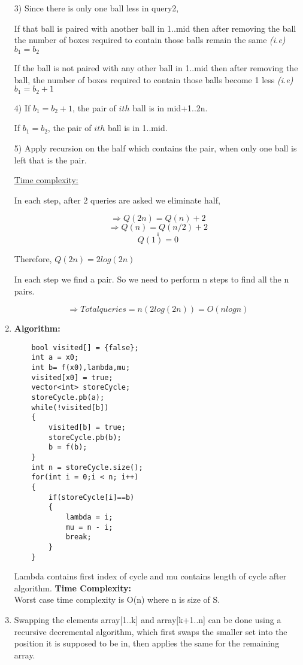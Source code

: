 \documentclass[12pt]{article}
\begin{document}
\begin{enumerate}
    3) Since there is only one ball less in query2,
    
    If that ball is paired with another ball in 1..mid then after removing the ball the number of boxes required to contain those balls remain the same \textit{(i.e)} $b_1 = b_2$
    
    If the ball is not paired with any other ball in 1..mid then after removing the ball, the number of boxes required to contain those balls become 1 less \textit{(i.e)} $b_1 = b_2 + 1$
    
    4) If $b_1 = b_2 + 1$, the pair of $ith$ ball is in mid+1..2n.
    
    If $b_1 = b_2$, the pair of $ith$ ball is in 1..mid.
    
    5) Apply recursion on the half which contains the pair, when only one ball is left that is the pair.
    
    \underline{Time complexity:}
    
    In each step, after 2 queries are asked we eliminate half,
    
    \[ \Rightarrow Q(2n) = Q(n) + 2\]
    \[ \Rightarrow Q(n) = Q(n/2) + 2\]
    \[.\]
    \[.\]
    \[.\]
    \[ Q(1) = 0 \]
    
    Therefore, $Q(2n) = 2log(2n)$
    
    In each step we find a pair. So we need to perform n steps to find all the n pairs.
    
    \[ \Rightarrow Total queries = n(2log(2n)) = O(nlogn) \]
        
    \item
    \textbf{Algorithm:}
    \begin{verbatim}
    bool visited[] = {false};
    int a = x0;
    int b= f(x0),lambda,mu;
    visited[x0] = true;
    vector<int> storeCycle;
    storeCycle.pb(a);
    while(!visited[b])
    {
        visited[b] = true;
        storeCycle.pb(b);
        b = f(b);
    }
    int n = storeCycle.size();
    for(int i = 0;i < n; i++)
    {
        if(storeCycle[i]==b)
        {
            lambda = i;
            mu = n - i;
            break;
        }
    }
    \end{verbatim}
    Lambda contains first index of cycle and mu contains length of cycle after algorithm.
    \textbf{Time Complexity:}
    \\Worst case time complexity is O(n) where n is size of S.
    \item
    Swapping the elements array[1..k] and array[k+1..n] can be done using a recursive decremental algorithm, which first swaps the smaller set into the position it is supposed to be in, then applies the same for the remaining array.
    

\end{enumerate}
\end{document}
